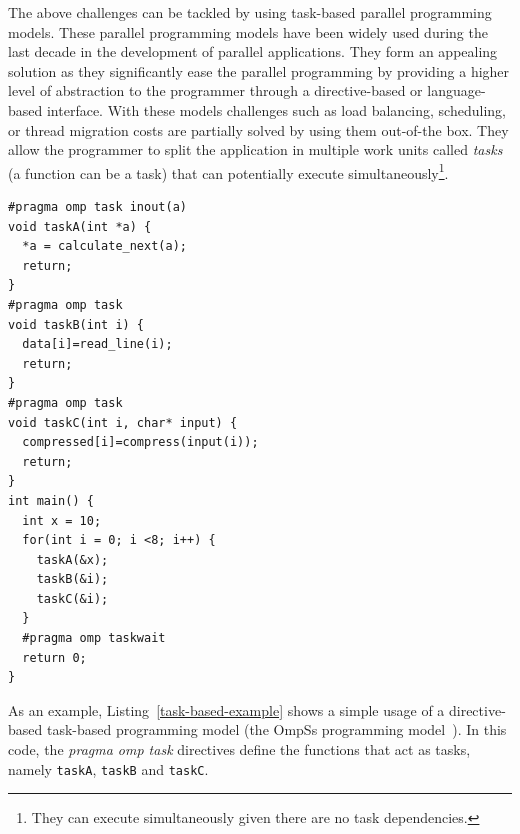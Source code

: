 The above challenges can be tackled by using task-based parallel programming models.
These parallel programming models have been widely used during the last decade in the development of parallel applications.
They form an appealing solution as they significantly ease the parallel programming by providing a higher level of abstraction to the programmer through a directive-based or language-based interface.
With these models challenges such as load balancing, scheduling, or thread migration costs are partially solved by using them out-of-the box.
They allow the programmer to split the application in multiple work units called \textit{tasks} (a function can be a task) that can potentially execute simultaneously\footnote{They can execute simultaneously given there are no task dependencies.}.
\begin{lstlisting}[float, caption={Example code using the OmpSs task-based programming model.},
label=task-based-example]
#pragma omp task inout(a)
void taskA(int *a) {
  *a = calculate_next(a); 
  return;
}
#pragma omp task
void taskB(int i) {
  data[i]=read_line(i);
  return;
}
#pragma omp task
void taskC(int i, char* input) {
  compressed[i]=compress(input(i));
  return;
}
int main() { 
  int x = 10;
  for(int i = 0; i <8; i++) {
    taskA(&x);
    taskB(&i);
    taskC(&i);
  }
  #pragma omp taskwait
  return 0;
}
\end{lstlisting}
As an example, Listing~\ref{task-based-example} shows a simple usage of a directive-based task-based programming model (the OmpSs programming model~\cite{OmpSs}).
In this code, the \textit{pragma omp task} directives define the functions that act as tasks, namely \texttt{taskA}, \texttt{taskB} and \texttt{taskC}.
